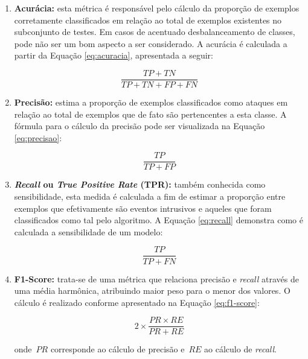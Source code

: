 \begin{enumerate}
    \item \textbf{Acurácia:} esta métrica é responsável pelo cálculo da proporção de exemplos corretamente classificados em relação ao total de exemplos existentes no subconjunto de testes. Em casos de acentuado desbalanceamento de classes, pode não ser um bom aspecto a ser considerado. A acurácia é calculada a partir da Equação \ref{eq:acuracia}, apresentada a seguir:
        
        \begin{equation} \label{eq:acuracia}
        \frac{TP + TN}{TP + TN + FP + FN}
        \end{equation}
        
    \item \textbf{Precisão:} estima a proporção de exemplos classificados como ataques em relação ao total de exemplos que de fato são pertencentes a esta classe. A fórmula para o cálculo da precisão pode ser visualizada na Equação \ref{eq:precisao}:
        
        \begin{equation} \label{eq:precisao}
        \frac{TP}{TP + FP}
        \end{equation}
        
    \item \textbf{\textit{Recall} ou \textit{True Positive Rate} (TPR):} também conhecida como sensibilidade, esta medida é calculada a fim de estimar a proporção entre exemplos que efetivamente são eventos intrusivos e aqueles que foram classificados como tal pelo algoritmo. A Equação \ref{eq:recall} demonstra como é calculada a sensibilidade de um modelo:
        
        \begin{equation} \label{eq:recall}
        \frac{TP}{TP + FN}
        \end{equation}
    
    \item \textbf{F1-Score:} trata-se de uma métrica que relaciona precisão e \textit{recall} através de uma média harmônica, atribuindo maior peso para o menor dos valores. O cálculo é realizado conforme apresentado na Equação \ref{eq:f1-score}:

        \begin{equation} \label{eq:f1-score}
        2 \times \frac{PR \times RE}{PR + RE}
        \end{equation}
        
        onde~$PR$ corresponde ao cálculo de precisão e~$RE$ ao cálculo de \textit{recall}.
\end{enumerate}

